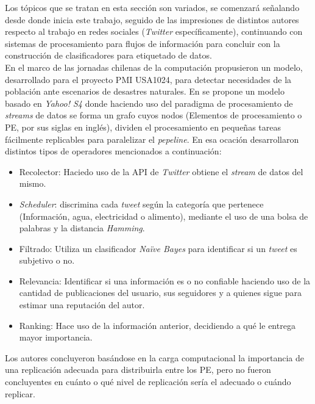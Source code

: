Los tópicos que se tratan en esta sección son variados, se comenzará señalando desde donde inicia este trabajo, seguido de las impresiones de distintos autores respecto al trabajo en redes sociales (\textit{Twitter} específicamente), continuando con sistemas de procesamiento para flujos de información para concluir con la construcción de clasificadores para etiquetado de datos.\\

En el marco de las jornadas chilenas de la computación \cite{WladdimiroPMI} propusieron un modelo, desarrollado para el proyecto PMI USA1024, para detectar necesidades de la población ante escenarios de desastres naturales. En se propone un modelo basado en \textit{Yahoo! S4} donde haciendo uso del paradigma de procesamiento de \textit{streams} de datos se forma un grafo cuyos nodos (Elementos de procesamiento o PE, por sus siglas en inglés), dividen el procesamiento en pequeñas tareas fácilmente replicables para paralelizar el \textit{pepeline}. En esa ocación desarrollaron distintos tipos de operadores mencionados a continuación:

\begin{itemize}
\item Recolector: Haciedo uso de la API de \textit{Twitter} obtiene el \textit{stream} de datos del mismo. 
\item \textit{Scheduler}: discrimina cada \textit{tweet} según la categoría que pertenece (Información, agua, electricidad o alimento), mediante el uso de una bolsa de palabras y la distancia \textit{Hamming}.
\item Filtrado: Utiliza un clasificador \textit{Naïve Bayes} para identificar si un \textit{tweet} es subjetivo o no.
\item Relevancia: Identificar si una información es o no confiable haciendo uso de la cantidad de publicaciones del usuario, sus seguidores y a quienes sigue para estimar una reputación del autor.
\item Ranking: Hace uso de la información anterior, decidiendo a qué le entrega mayor importancia.
\end{itemize}

Los autores concluyeron basándose en la carga computacional la importancia de una replicación adecuada para distribuirla entre los PE, pero no fueron concluyentes en cuánto o qué nivel de replicación sería el adecuado o cuándo replicar.\\

